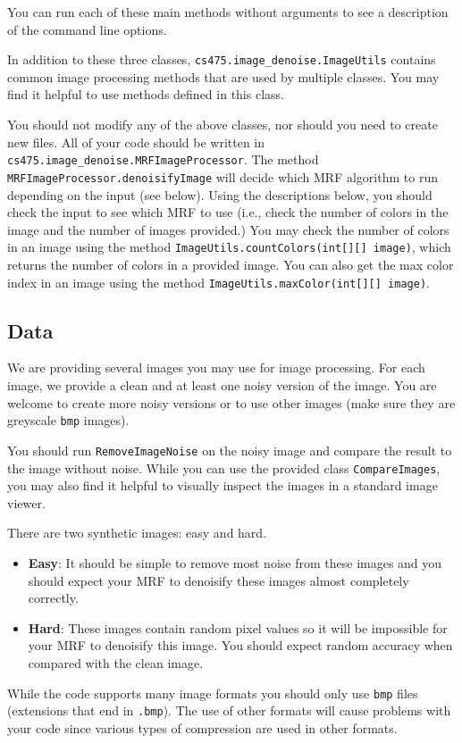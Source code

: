 \documentclass[11pt]{article}
\newcommand{\code}[1]{{\footnotesize \tt #1}}
\begin{document}
You can run each of these main methods without arguments to see a description of the command line options.

In addition to these three classes, \code{cs475.image\_denoise.ImageUtils} contains common image processing methods that are used by multiple classes. You may find it helpful to use methods defined in this class.

You should not modify any of the above classes, nor should you need to create new files. All of your code should be written in \code{cs475.image\_denoise.MRFImageProcessor}. The method \code{MRFImageProcessor.denoisifyImage} will decide which MRF algorithm to run depending on the input (see below). Using the descriptions below, you should check the input to see which MRF to use (i.e., check the number of colors in the image and the number of images provided.) You may check the number of colors in an image using the method \code{ImageUtils.countColors(int[][] image)}, which returns the number of colors in a provided image. You can also get the max color index in an image using the method \code{ImageUtils.maxColor(int[][] image)}.


\subsection{Data}
We are providing several images you may use for image processing. For each image, we provide a clean and at least one noisy version of the image. You are welcome to create more noisy versions or to use other images (make sure they are greyscale \code{bmp} images). 

You should run \code{RemoveImageNoise} on the noisy image and compare the result to the image without noise. While you can use the provided 
class \code{CompareImages}, you may also find it helpful to visually inspect the images in a standard image viewer.

There are two synthetic images: easy and hard.
\begin{itemize}
\item {\bf Easy}: It should be simple to remove most noise from these images and you should expect your MRF to denoisify these images almost completely correctly.
\item {\bf Hard}: These images contain random pixel values so it will be impossible for your MRF to denoisify this image. You should expect random accuracy when compared with the clean image.
\end{itemize}

While the code supports many image formats you should only use \code{bmp} files (extensions that end in \code{.bmp}). The use of other formats will cause problems with your code since various types of compression are used in other formats.
\end{document}
